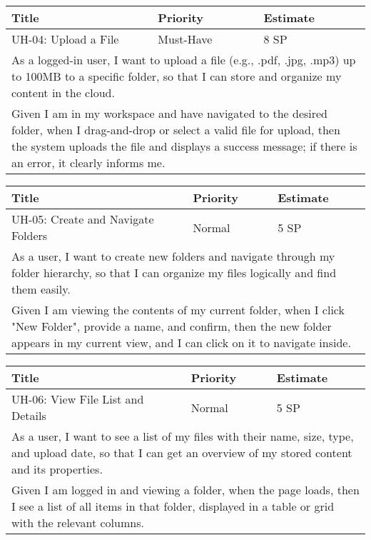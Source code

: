\vspace{5mm}
\begin{tabular}{|p{4cm}|p{5cm}|p{5cm}|}
    \hline
    \textbf{Title} & \textbf{Priority} & \textbf{Estimate} \\
    \hline
    UH-04: Upload a File & Must-Have & 8 SP \\
    \hline
    \multicolumn{3}{|p{14cm}|}{As a logged-in user, I want to upload a file (e.g., .pdf, .jpg, .mp3) up to 100MB to a specific folder, so that I can store and organize my content in the cloud.} \\
    \hline
    \multicolumn{3}{|p{14cm}|}{Given I am in my workspace and have navigated to the desired folder, when I drag-and-drop or select a valid file for upload, then the system uploads the file and displays a success message; if there is an error, it clearly informs me.} \\
    \hline
\end{tabular}

\vspace{5mm}
\begin{tabular}{|p{4cm}|p{5cm}|p{5cm}|}
    \hline
    \textbf{Title} & \textbf{Priority} & \textbf{Estimate} \\
    \hline
    UH-05: Create and Navigate Folders & Normal & 5 SP \\
    \hline
    \multicolumn{3}{|p{14cm}|}{As a user, I want to create new folders and navigate through my folder hierarchy, so that I can organize my files logically and find them easily.} \\
    \hline
    \multicolumn{3}{|p{14cm}|}{Given I am viewing the contents of my current folder, when I click "New Folder", provide a name, and confirm, then the new folder appears in my current view, and I can click on it to navigate inside.} \\
    \hline
\end{tabular}

\vspace{5mm}
\begin{tabular}{|p{4cm}|p{5cm}|p{5cm}|}
    \hline
    \textbf{Title} & \textbf{Priority} & \textbf{Estimate} \\
    \hline
    UH-06: View File List and Details & Normal & 5 SP \\
    \hline
    \multicolumn{3}{|p{14cm}|}{As a user, I want to see a list of my files with their name, size, type, and upload date, so that I can get an overview of my stored content and its properties.} \\
    \hline
    \multicolumn{3}{|p{14cm}|}{Given I am logged in and viewing a folder, when the page loads, then I see a list of all items in that folder, displayed in a table or grid with the relevant columns.} \\
    \hline
\end{tabular}

